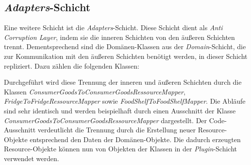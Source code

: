 
\subsection*{\textit{Adapters}-Schicht}
Eine weitere Schicht ist die \textit{Adapters}-Schicht.
Diese Schicht dient als \textit{Anti Corruption Layer}, indem sie die inneren Schichten von den äußeren Schichten trennt.
Dementsprechend sind die Domänen-Klassen aus der \textit{Domain}-Schicht, die zur Kommunikation mit den äußeren Schichten benötigt werden, in dieser Schicht repliziert.
Dazu zählen die folgenden Klassen:

Durchgeführt wird diese Trennung der inneren und äußeren Schichten durch die Klassen \textit{ConsumerGoodsToConsumerGoodsRessourceMapper}, \textit{FridgeToFridgeRessourceMapper} sowie \textit{FoodShelfToFoodShelfMapper}.
Die Abläufe sind sehr identisch und werden beispielhaft durch einen Ausschnitt der Klasse \textit{ConsumerGoodsToConsumerGoodsRessourceMapper} dargestellt.
Der Code-Ausschnitt verdeutlicht die Trennung durch die Erstellung neuer Resource-Objekte entsprechend den Daten der Domänen-Objekte.
Die dadurch erzeugten Resource-Objekte können nun von Objekten der Klassen in der \textit{Plugin}-Schicht verwendet werden.

